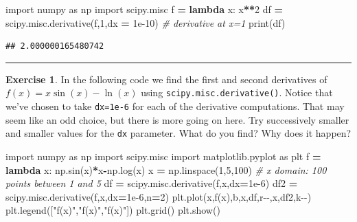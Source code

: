 \documentclass[
]{book}
\newenvironment{Shaded}{\begin{snugshade}}{\end{snugshade}}
\newcommand{\BuiltInTok}[1]{#1}
\newcommand{\CommentTok}[1]{\textcolor[rgb]{0.56,0.35,0.01}{\textit{#1}}}
\newcommand{\DecValTok}[1]{\textcolor[rgb]{0.00,0.00,0.81}{#1}}
\newcommand{\FloatTok}[1]{\textcolor[rgb]{0.00,0.00,0.81}{#1}}
\newcommand{\ImportTok}[1]{#1}
\newcommand{\KeywordTok}[1]{\textcolor[rgb]{0.13,0.29,0.53}{\textbf{#1}}}
\newcommand{\NormalTok}[1]{#1}
\newcommand{\OperatorTok}[1]{\textcolor[rgb]{0.81,0.36,0.00}{\textbf{#1}}}
\newcommand{\StringTok}[1]{\textcolor[rgb]{0.31,0.60,0.02}{#1}}
\theoremstyle{definition}
\theoremstyle{definition}
\theoremstyle{definition}
\newtheorem{exercise}{Exercise}[chapter]
\theoremstyle{remark}
\begin{document}
\begin{Shaded}
\begin{Highlighting}[]
\ImportTok{import}\NormalTok{ numpy }\ImportTok{as}\NormalTok{ np}
\ImportTok{import}\NormalTok{ scipy.misc}
\NormalTok{f }\OperatorTok{=} \KeywordTok{lambda}\NormalTok{ x: x}\OperatorTok{**}\DecValTok{2}
\NormalTok{df }\OperatorTok{=}\NormalTok{ scipy.misc.derivative(f,}\DecValTok{1}\NormalTok{,dx }\OperatorTok{=} \FloatTok{1e{-}10}\NormalTok{) }\CommentTok{\# derivative at x=1}
\BuiltInTok{print}\NormalTok{(df)}
\end{Highlighting}
\end{Shaded}

\begin{verbatim}
## 2.000000165480742
\end{verbatim}

\begin{center}\rule{0.5\linewidth}{0.5pt}\end{center}

\begin{exercise}
\protect\hypertarget{exr:unnamed-chunk-223}{}{\label{exr:unnamed-chunk-223} }In the following code we find the first and second derivatives of \(f(x) = x\sin(x) - \ln(x)\) using \texttt{scipy.misc.derivative()}. Notice that we've chosen to take \texttt{dx=1e-6} for each of the derivative computations. That may seem like an odd choice, but there is more going on here. Try successively smaller and smaller values for the \texttt{dx} parameter. What do you find? Why does it happen?
\end{exercise}

\begin{Shaded}
\begin{Highlighting}[]
\ImportTok{import}\NormalTok{ numpy }\ImportTok{as}\NormalTok{ np}
\ImportTok{import}\NormalTok{ scipy.misc }
\ImportTok{import}\NormalTok{ matplotlib.pyplot }\ImportTok{as}\NormalTok{ plt}
\NormalTok{f }\OperatorTok{=} \KeywordTok{lambda}\NormalTok{ x: np.sin(x)}\OperatorTok{*}\NormalTok{x}\OperatorTok{{-}}\NormalTok{np.log(x)}
\NormalTok{x }\OperatorTok{=}\NormalTok{ np.linspace(}\DecValTok{1}\NormalTok{,}\DecValTok{5}\NormalTok{,}\DecValTok{100}\NormalTok{) }\CommentTok{\# x domain: 100 points between 1 and 5}
\NormalTok{df }\OperatorTok{=}\NormalTok{ scipy.misc.derivative(f,x,dx}\OperatorTok{=}\FloatTok{1e{-}6}\NormalTok{)}
\NormalTok{df2 }\OperatorTok{=}\NormalTok{ scipy.misc.derivative(f,x,dx}\OperatorTok{=}\FloatTok{1e{-}6}\NormalTok{,n}\OperatorTok{=}\DecValTok{2}\NormalTok{)}
\NormalTok{plt.plot(x,f(x),}\StringTok{\textquotesingle{}b\textquotesingle{}}\NormalTok{,x,df,}\StringTok{\textquotesingle{}r{-}{-}\textquotesingle{}}\NormalTok{,x,df2,}\StringTok{\textquotesingle{}k{-}{-}\textquotesingle{}}\NormalTok{)}
\NormalTok{plt.legend([}\StringTok{"f(x)"}\NormalTok{,}\StringTok{"f\textquotesingle{}(x)"}\NormalTok{,}\StringTok{"f\textquotesingle{}\textquotesingle{}(x)"}\NormalTok{])}
\NormalTok{plt.grid()}
\NormalTok{plt.show()}
\end{Highlighting}
\end{Shaded}
\end{document}
